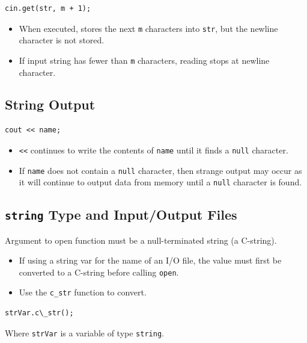 \documentclass{article}
\begin{document}
\begin{lstlisting}[caption={Read Strings with Blanks with \texttt{get}}]
  cin.get(str, m + 1);
\end{lstlisting}

\begin{itemize}
  \item When executed, stores the next \texttt{m} characters into \texttt{str}, but the
newline character is not stored.
  \item If input string has fewer than \texttt{m} characters, reading stops at
    newline character.
\end{itemize}

\subsection{String Output}
\begin{lstlisting}[caption={String Output Example}]
  cout << name;
\end{lstlisting}

\begin{itemize}
  \item \texttt{<<} continues to write the contents of \texttt{name} until it
    finds a \texttt{null} character.
  \item If \texttt{name} does not contain a \texttt{null} character, then
    strange output may occur as it will continue to output data from memory until a
    \texttt{null} character is found.
\end{itemize}


\subsection{\texttt{string} Type and Input/Output Files}
Argument to open function must be a null-terminated string (a C-string).

\begin{itemize}
  \item If using a string var for the name of an I/O file, the value must first
    be converted to a C-string before calling \texttt{open}.
  \item Use the \texttt{c\_str} function to convert.
\end{itemize}

\begin{lstlisting}[caption={\texttt{c\_str} Syntax}]
  strVar.c\_str();
\end{lstlisting}

Where \texttt{strVar} is a variable of type \texttt{string}.
\end{document}
